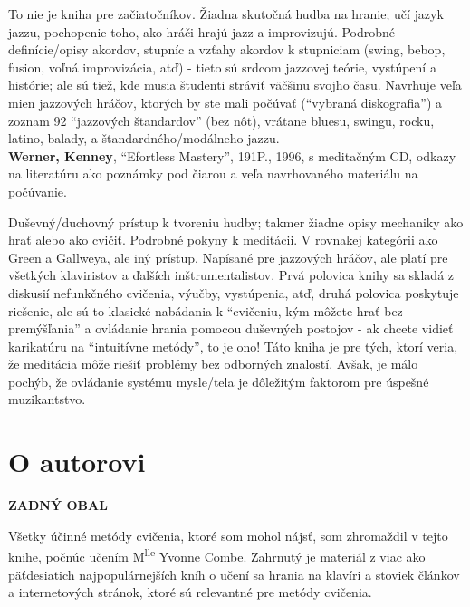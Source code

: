 \documentclass[11pt,a4paper]{book}
\begin{document}
To nie je kniha pre začiatočníkov. Žiadna skutočná hudba na hranie; učí jazyk jazzu, pochopenie toho, ako hráči hrajú jazz a improvizujú. Podrobné definície/opisy akordov, stupníc a vzťahy akordov k stupniciam (swing, bebop, fusion, voľná improvizácia, atď) - tieto sú srdcom jazzovej teórie, vystúpení a histórie; ale sú tiež, kde musia študenti stráviť väčšinu svojho času. Navrhuje veľa mien jazzových hráčov, ktorých by ste mali počúvať (“vybraná diskografia”) a zoznam 92 “jazzových štandardov” (bez nôt), vrátane bluesu, swingu, rocku, latino, balady, a štandardného/modálneho jazzu.
\medskip\\
\textbf{Werner, Kenney}, “Efortless Mastery”, 191P., 1996, s meditačným CD, odkazy na literatúru ako poznámky pod čiarou a veľa navrhovaného materiálu na počúvanie. 

Duševný/duchovný prístup k tvoreniu hudby; takmer žiadne opisy mechaniky ako hrať alebo ako cvičiť. Podrobné pokyny k meditácii. V rovnakej kategórii ako Green a Gallweya, ale iný prístup. Napísané pre jazzových hráčov, ale platí pre všetkých klaviristov a ďalších inštrumentalistov. Prvá polovica knihy sa skladá z diskusií nefunkčného cvičenia, výučby, vystúpenia, atď, druhá polovica poskytuje riešenie, ale sú to klasické nabádania k “cvičeniu, kým môžete hrať bez premýšľania” a ovládanie hrania pomocou duševných postojov - ak chcete vidieť karikatúru na “intuitívne metódy”, to je ono! Táto kniha je pre tých, ktorí veria, že meditácia môže riešiť problémy bez odborných znalostí. Avšak, je málo pochýb, že ovládanie systému mysle/tela je dôležitým faktorom pre úspešné muzikantstvo.

\chapter*{O autorovi}\label{s:about-author}

{}
\printindex
\clearpage

\thispagestyle{empty}
\begin{center}
{\large\bf ZADNÝ OBAL}
\end{center}

\vspace*{2em}

Všetky účinné metódy cvičenia, ktoré som mohol nájsť, som zhromaždil v tejto knihe, počnúc učením M\textsuperscript{lle} Yvonne Combe. Zahrnutý je materiál z viac ako päťdesiatich najpopulárnejších kníh o učení sa hrania na klavíri a stoviek článkov a internetových stránok, ktoré sú relevantné pre metódy cvičenia.
\end{document}
